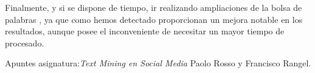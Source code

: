 \documentclass[11pt,a4paper]{article}
\begin{document}
 Finalmente, y si se dispone de tiempo, ir realizando ampliaciones de la bolsa de palabras , ya que como hemos detectado proporcionan un mejora notable en los resultados, aunque posee el inconveniente de necesitar un mayor tiempo de procesado.

\begin{thebibliography}{}

\newblock Apuntes asignatura:{\em Text Mining en Social Media}
\newblock Paolo Rosso y Francisco Rangel.

\end{thebibliography}
\end{document}
